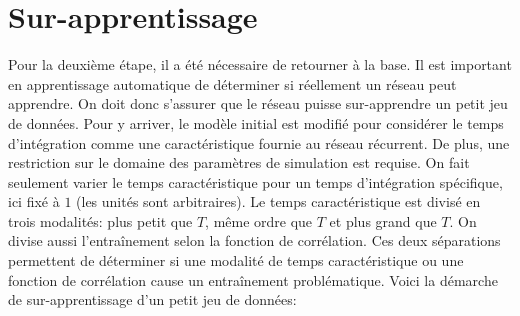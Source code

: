\documentclass[MSc,french]{ulthese}
\begin{document}
\section{Sur-apprentissage}
Pour la deuxième étape, il a été nécessaire de retourner à la base. Il est important en apprentissage automatique de déterminer si réellement un réseau peut apprendre. On doit donc s'assurer que le réseau puisse sur-apprendre un petit jeu de données. Pour y arriver, le modèle initial est modifié pour considérer le temps d'intégration comme une caractéristique fournie au réseau récurrent. De plus, une restriction sur le domaine des paramètres de simulation est requise. On fait seulement varier le temps caractéristique pour un temps d'intégration spécifique, ici fixé à $1$ (les unités sont arbitraires). Le temps caractéristique est divisé en trois modalités: plus petit que $T$, même ordre que $T$ et plus grand que $T$. On divise aussi l'entraînement selon la fonction de corrélation. Ces deux séparations permettent de déterminer si une modalité de temps caractéristique ou une fonction de corrélation cause un entraînement problématique. Voici la démarche de sur-apprentissage d'un petit jeu de données:
\end{document}
